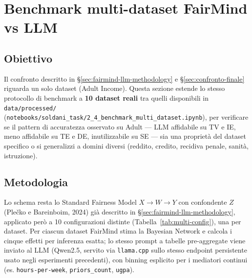 %

\section{Benchmark multi-dataset FairMind vs LLM}
\label{sec:multi-dataset-benchmark}

\subsection*{Obiettivo}

Il confronto descritto in \S\ref{sec:fairmind-llm-methodology} e \S\ref{sec:confronto-finale} riguarda un solo dataset (Adult Income). Questa sezione estende lo stesso protocollo di benchmark a \textbf{10 dataset reali} tra quelli disponibili in \texttt{data/processed/} (\texttt{notebooks/soldani\_task/2\_4\_benchmark\_multi\_dataset.ipynb}), per verificare se il pattern di accuratezza osservato su Adult --- LLM affidabile su TV e IE, meno affidabile su TE e DE, inutilizzabile su SE --- sia una propriet\`a del dataset specifico o si generalizzi a domini diversi (reddito, credito, recidiva penale, sanit\`a, istruzione).

\subsection*{Metodologia}

Lo schema resta lo Standard Fairness Model $X \to W \to Y$ con confondente $Z$ (Ple\v{c}ko e Bareinboim, 2024) gi\`a descritto in \S\ref{sec:fairmind-llm-methodology}, applicato per\`o a 10 configurazioni distinte (Tabella~\ref{tab:multi-config}), una per dataset. Per ciascun dataset FairMind stima la Bayesian Network e calcola i cinque effetti per inferenza esatta; lo stesso prompt a tabelle pre-aggregate viene inviato al LLM (Qwen2.5, servito via \texttt{llama.cpp} sullo stesso endpoint persistente usato negli esperimenti precedenti), con binning esplicito per i mediatori continui (es. \texttt{hours-per-week}, \texttt{priors\_count}, \texttt{ugpa}).

